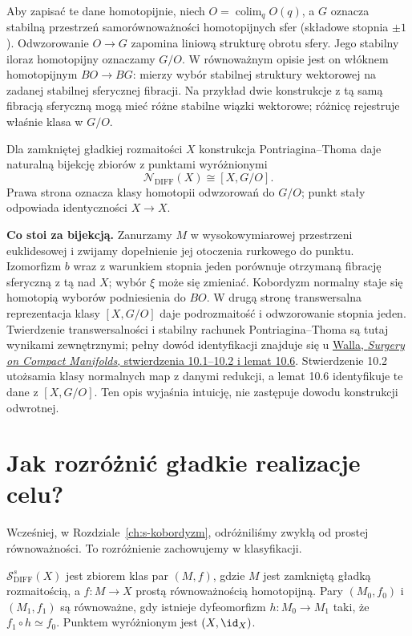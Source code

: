 Aby zapisać te dane homotopijnie, niech
$O=\operatorname*{colim}_{q}O(q)$, a $G$ oznacza
stabilną przestrzeń samorównoważności
homotopijnych sfer (składowe stopnia $\pm1$).
Odwzorowanie $O\to G$ zapomina liniową
strukturę obrotu sfery. Jego stabilny iloraz
homotopijny oznaczamy $G/O$.
W równoważnym opisie jest on włóknem
homotopijnym $BO\to BG$: mierzy wybór
stabilnej struktury wektorowej na zadanej
stabilnej sferycznej fibracji.
Na przykład dwie konstrukcje z tą samą
fibracją sferyczną mogą mieć różne
stabilne wiązki wektorowe; różnicę rejestruje
właśnie klasa w $G/O$.

\begin{twierdzenie}
\label{thm:normal-invariants-GO-23}
Dla zamkniętej gładkiej rozmaitości $X$
konstrukcja Pontriagina--Thoma daje
naturalną bijekcję zbiorów z punktami
wyróżnionymi
\[
 \mathcal N_{\mathrm{DIFF}}(X)\cong [X,G/O].
\]
Prawa strona oznacza klasy homotopii
odwzorowań do $G/O$; punkt stały odpowiada
identyczności $X\to X$.
\end{twierdzenie}

\noindent\textbf{Co stoi za bijekcją.}
Zanurzamy $M$ w wysokowymiarowej przestrzeni
euklidesowej i zwijamy dopełnienie jej
otoczenia rurkowego do punktu.
Izomorfizm $b$ wraz z warunkiem stopnia jeden
porównuje otrzymaną fibrację sferyczną z tą
nad $X$; wybór $\xi$ może się zmieniać.
Kobordyzm normalny staje się homotopią
wyborów podniesienia do $BO$.
W drugą stronę transwersalna reprezentacja
klasy $[X,G/O]$ daje podrozmaitość i
odwzorowanie stopnia jeden.
Twierdzenie transwersalności i stabilny
rachunek Pontriagina--Thoma są tutaj
wynikami zewnętrznymi; pełny dowód
identyfikacji znajduje się u
\href{https://webhomes.maths.ed.ac.uk/~v1ranick/books/scm.pdf}
{Walla, \emph{Surgery on Compact Manifolds},
stwierdzenia 10.1–10.2 i lemat 10.6}.
Stwierdzenie 10.2 utożsamia klasy normalnych
map z danymi redukcji, a lemat 10.6
identyfikuje te dane z $[X,G/O]$.
Ten opis wyjaśnia intuicję, nie zastępuje
dowodu konstrukcji odwrotnej.

\section{Jak rozróżnić gładkie realizacje celu?}
\label{sec:zbior-struktur-23}

Wcześniej, w Rozdziale~\ref{ch:s-kobordyzm},
odróżniliśmy zwykłą od prostej równoważności.
To rozróżnienie zachowujemy w klasyfikacji.

\begin{definicja}
\label{def:structure-set-23}
$\mathcal S^s_{\mathrm{DIFF}}(X)$ jest zbiorem
klas par $(M,f)$, gdzie $M$ jest zamkniętą
gładką rozmaitością, a $f:M\to X$ prostą
równoważnością homotopijną. Pary $(M_0,f_0)$
i $(M_1,f_1)$ są równoważne, gdy istnieje
dyfeomorfizm $h:M_0\to M_1$ taki, że
$f_1\circ h\simeq f_0$. Punktem wyróżnionym
jest $(X,\id_X)$.
\end{definicja}

